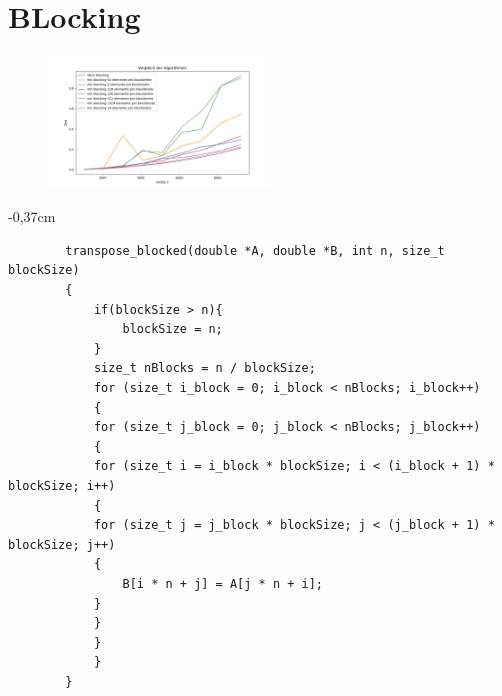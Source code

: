 \documentclass[sigconf,language=ngerman]{acmart}
\begin{document}
\section{BLocking}

\begin{figure}[h]
    \hspace{-0.46cm} %
    \caption{}
    \includegraphics[width=0.525\textwidth]{blocking_MVP.png}
    \label{MVPblocked}
\end{figure}


\begin{tiny}
    \begin{adjustwidth}{-0,37cm}{}
    \begin{footnotesize}
    \begin{auflistung}
    \caption{Implementierung der blockierten Matrixtransposition}
    \label{Matrixtransposition}
    \begin{verbatim}
        transpose_blocked(double *A, double *B, int n, size_t blockSize)
        {
            if(blockSize > n){
                blockSize = n;
            } 
            size_t nBlocks = n / blockSize;
            for (size_t i_block = 0; i_block < nBlocks; i_block++)
            {
            for (size_t j_block = 0; j_block < nBlocks; j_block++)
            {
            for (size_t i = i_block * blockSize; i < (i_block + 1) * blockSize; i++)
            {
            for (size_t j = j_block * blockSize; j < (j_block + 1) * blockSize; j++)
            {
                B[i * n + j] = A[j * n + i];
            }
            }
            }
            }
        }
\end{verbatim}
\end{auflistung}
\end{footnotesize}
\end{adjustwidth}
\end{tiny}
\end{document}

